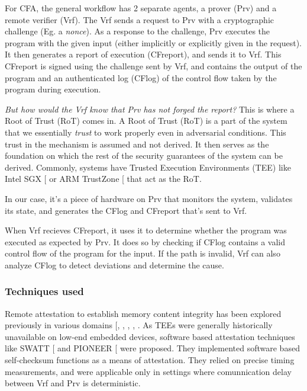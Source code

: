 \documentclass[a4paper, nobind]{templates/ociamthesis}
\begin{document}
For CFA, the general workflow has 2 separate agents, a prover (Prv) and a remote verifier (Vrf).
The Vrf sends a request to Prv with a cryptographic challenge (Eg. a \emph{nonce}).
As a response to the challenge, Prv executes the program with the given
input (either implicitly or explicitly given in the request).
It then generates a report of execution (CFreport), and sends it to Vrf.
This CFreport is signed using the challenge sent by Vrf, and contains the output of the program and an
authenticated log (CFlog) of the control flow taken by the program during execution.

\emph{But how would the Vrf know that Prv has not forged the report?}
This is where a Root of Trust (RoT) comes in.
A Root of Trust (RoT) is a part of the system that we essentially \emph{trust} to work
properly even in adversarial conditions. This trust in the mechanism is assumed and not derived.
It then serves as the foundation on which the rest of the security guarantees
of the system can be derived. Commonly, systems have Trusted Execution Environments
(TEE) like Intel SGX {[}\citeproc{ref-intel-sgx}{33}{]} or ARM TrustZone {[}\citeproc{ref-armtz}{7}{]} that act as the RoT.

In our case, it's a piece of hardware on Prv that monitors the system, validates its state,
and generates the CFlog and CFreport that's sent to Vrf.

When Vrf recieves CFreport, it uses it to determine whether the program was executed as expected by Prv.
It does so by checking if CFlog contains a valid control flow of the program
for the input. If the path is invalid, Vrf can also analyze CFlog to detect
deviations and determine the cause.

\subsubsection{Techniques used}\label{cfatechniques}

Remote attestation to establish memory content integrity has been explored previously
in various domains {[}, , , , \citeproc{ref-sun2020oat}{53}{]}.
As TEEs were generally historically unavailable on low-end embedded devices,
software based attestation techniques like SWATT {[}\citeproc{ref-seshadri2004swatt}{50}{]} and
PIONEER {[}\citeproc{ref-seshadri2005pioneer}{49}{]} were proposed.
They implemented software based self-checksum functions as a means of attestation.
They relied on precise timing measurements, and were applicable only in settings where
comunnication delay between Vrf and Prv is deterministic.
\end{document}
